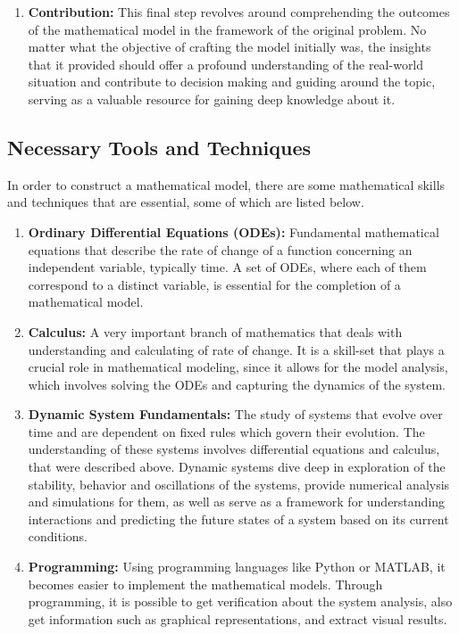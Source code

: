 \documentclass[class={myRUCProject}, crop=false]{standalone}
\begin{document}
\begin{enumerate}
    \item \textbf{Contribution:} This final step revolves around comprehending the outcomes of the mathematical model in the framework of the original problem. No matter what the objective of crafting the model initially was, the insights that it provided should offer a profound understanding of the real-world situation and contribute to decision making and guiding around the topic, serving as a valuable resource for gaining deep knowledge about it.

\end{enumerate}

\subsection{Necessary Tools and Techniques}

In order to construct a mathematical model, there are some mathematical skills and techniques that are essential, some of which are listed below.


\begin{enumerate}
    \item \textbf{Ordinary Differential Equations (ODEs):} Fundamental mathematical equations that describe the rate of change of a function concerning an independent variable, typically time. A set of ODEs, where each of them correspond to a distinct variable, is essential for the completion of a mathematical model.
    \item \textbf{Calculus:} A very important branch of mathematics that deals with understanding and calculating of rate of change. It is a skill-set that plays a crucial role in mathematical modeling, since it allows for the model analysis, which involves solving the ODEs and capturing the dynamics of the system.
    \item \textbf{Dynamic System Fundamentals:} The study of systems that evolve over time and are dependent on fixed rules which govern their evolution. The understanding of these systems involves differential equations and calculus, that were described above. Dynamic systems dive deep in exploration of the stability, behavior and oscillations of the systems, provide numerical analysis and simulations for them, as well as serve as a framework for understanding interactions and predicting the future states of a system based on its current conditions.
    \item \textbf{Programming:} Using programming languages like Python or MATLAB, it becomes easier to implement the mathematical models. Through programming, it is possible to get verification about the system analysis, also get information such as graphical representations, and extract visual results. 
\end{enumerate}
\end{document}
